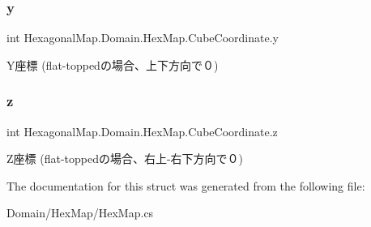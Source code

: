 \subsubsection{\texorpdfstring{y}{y}}
{\footnotesize\ttfamily int Hexagonal\+Map.\+Domain.\+Hex\+Map.\+Cube\+Coordinate.\+y\hspace{0.3cm}{\ttfamily [get]}}



Y座標 (flat-\/toppedの場合、上下方向で０) 

\mbox{\label{struct_hexagonal_map_1_1_domain_1_1_hex_map_1_1_cube_coordinate_a34cecd0b18328917cf707fb108cf18bb}} 
\subsubsection{\texorpdfstring{z}{z}}
{\footnotesize\ttfamily int Hexagonal\+Map.\+Domain.\+Hex\+Map.\+Cube\+Coordinate.\+z\hspace{0.3cm}{\ttfamily [get]}}



Z座標 (flat-\/toppedの場合、右上-\/右下方向で０) 



The documentation for this struct was generated from the following file\+:\begin{DoxyCompactItemize}
\item 
Domain/\+Hex\+Map/Hex\+Map.\+cs\end{DoxyCompactItemize}
